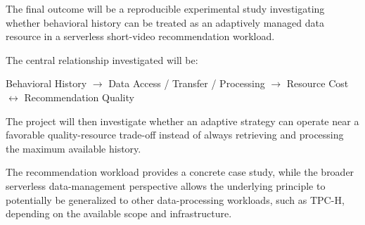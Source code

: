 \documentclass[12pt,a4paper]{article}
\begin{document}
The final outcome will be a reproducible experimental study investigating whether behavioral history can be treated as an adaptively managed data resource in a serverless short-video recommendation workload.

The central relationship investigated will be:
\begin{center}
Behavioral History $\rightarrow$ Data Access / Transfer / Processing $\rightarrow$ Resource Cost $\leftrightarrow$ Recommendation Quality
\end{center}

The project will then investigate whether an adaptive strategy can operate near a favorable quality-resource trade-off instead of always retrieving and processing the maximum available history.

The recommendation workload provides a concrete case study, while the broader serverless data-management perspective allows the underlying principle to potentially be generalized to other data-processing workloads, such as TPC-H, depending on the available scope and infrastructure.
\end{document}
